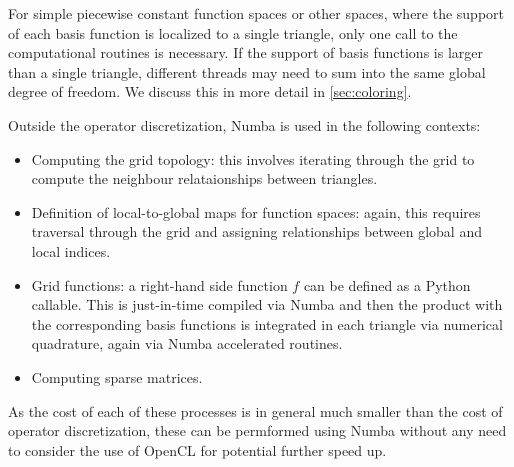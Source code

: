 For simple piecewise constant function spaces or other spaces, where the support of each basis function is localized to a single triangle, only one call to the computational routines is necessary. If the support of basis functions is larger than a single triangle, different threads may need to sum into the same global degree of freedom. We discuss this in more detail in \cref{sec:coloring}.

Outside the operator discretization, Numba is used in the following contexts:
\begin{itemize}
  \item Computing the grid topology: this involves iterating through the grid to compute the neighbour relataionships between triangles.
  \item Definition of local-to-global maps for function spaces: again, this requires traversal through the grid and assigning relationships between global and local indices.
  \item Grid functions: a right-hand side function $f$ can be defined as a Python callable. This is just-in-time compiled via Numba and then the product with the corresponding basis functions is integrated in each triangle via numerical quadrature, again via Numba accelerated routines.
  \item Computing sparse matrices.
\end{itemize}

As the cost of each of these processes is in general much smaller than the cost of operator discretization, these can be permformed using Numba without any need to consider the use of OpenCL for potential further speed up.
